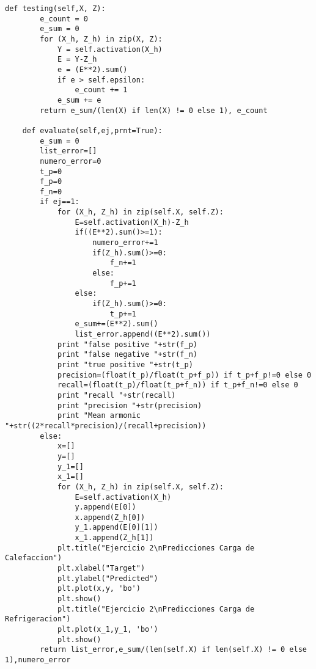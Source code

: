 \begin{lstlisting}[caption=new\_perceptron.py]
	def testing(self,X, Z):
		e_count = 0
		e_sum = 0
		for (X_h, Z_h) in zip(X, Z):
			Y = self.activation(X_h)
			E = Y-Z_h
			e = (E**2).sum()
			if e > self.epsilon:
				e_count += 1
			e_sum += e
		return e_sum/(len(X) if len(X) != 0 else 1), e_count

	def evaluate(self,ej,prnt=True):	
		e_sum = 0
		list_error=[]
		numero_error=0
		t_p=0
		f_p=0
		f_n=0
		if ej==1:
			for (X_h, Z_h) in zip(self.X, self.Z):
				E=self.activation(X_h)-Z_h
				if((E**2).sum()>=1):
					numero_error+=1
					if(Z_h).sum()>=0:
						f_n+=1
					else:
						f_p+=1
				else:
					if(Z_h).sum()>=0:
						t_p+=1
				e_sum+=(E**2).sum()
				list_error.append((E**2).sum())
			print "false positive "+str(f_p)
			print "false negative "+str(f_n)
			print "true positive "+str(t_p)
			precision=(float(t_p)/float(t_p+f_p)) if t_p+f_p!=0 else 0 
			recall=(float(t_p)/float(t_p+f_n)) if t_p+f_n!=0 else 0 
			print "recall "+str(recall)
			print "precision "+str(precision)
			print "Mean armonic "+str((2*recall*precision)/(recall+precision))
		else:
			x=[]
			y=[]
			y_1=[]
			x_1=[]
			for (X_h, Z_h) in zip(self.X, self.Z):
				E=self.activation(X_h)
				y.append(E[0])
				x.append(Z_h[0])
				y_1.append(E[0][1])
				x_1.append(Z_h[1])
			plt.title("Ejercicio 2\nPredicciones Carga de Calefaccion")
			plt.xlabel("Target")
			plt.ylabel("Predicted")
			plt.plot(x,y, 'bo')
			plt.show()
			plt.title("Ejercicio 2\nPredicciones Carga de Refrigeracion")
			plt.plot(x_1,y_1, 'bo')
			plt.show()
		return list_error,e_sum/(len(self.X) if len(self.X) != 0 else 1),numero_error	
\end{lstlisting}

